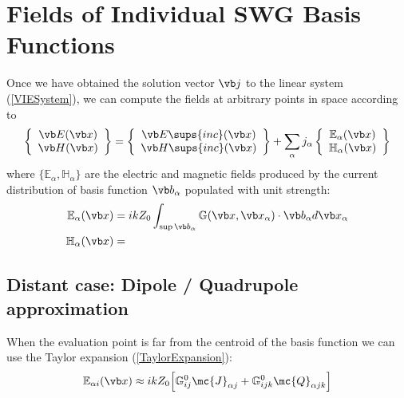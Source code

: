 \documentclass[letterpaper]{article}
\begin{document}
\newpage
\section{Fields of Individual SWG Basis Functions}

Once we have obtained the solution vector $\vb j$ to the 
linear system (\ref{VIESystem}), we can compute the fields
at arbitrary points in space according to 
$$ \left\{ \begin{array}{c} \vb E(\vb x) \\ 
                            \vb H(\vb x) 
           \end{array} 
   \right\}
   = 
   \left\{ \begin{array}{c} \vb E\sups{inc}(\vb x) \\ 
                            \vb H\sups{inc}(\vb x) 
           \end{array} 
   \right\}
  + 
  \sum_\alpha j_\alpha
   \left\{ \begin{array}{c} \mathbb{E}_\alpha(\vb x) \\ 
                            \mathbb{H}_\alpha(\vb x)
           \end{array} 
   \right\}
$$
where $\{\mathbb{E}_\alpha, \mathbb{H}_\alpha\}$ are the
electric and magnetic fields produced by the current distribution
of basis function $\vb b_\alpha$ populated with unit strength:
\begin{align*}
 \mathbb{E}_\alpha(\vb x)
&= ikZ_0 
   \int_{\sup \vb b_\alpha} \mathbb{G}(\vb x, \vb x_\alpha) \cdot \vb b_\alpha
   d\vb x_\alpha
\\
 \mathbb{H}_\alpha(\vb x)
&= 
\end{align*}

\subsection*{Distant case: Dipole / Quadrupole approximation}

When the evaluation point is far from the centroid of the basis
function we can use the Taylor expansion (\ref{TaylorExpansion}):
$$
 \mathbb{E}_{\alpha i}(\vb x)
 \approx
 ikZ_0 \Big[   \mathbb{G}^0_{ij} \mc{J}_{\alpha j} 
             + \mathbb{G}^0_{ijk} \mc{Q}_{\alpha jk}
       \Big]
$$
\end{document}
